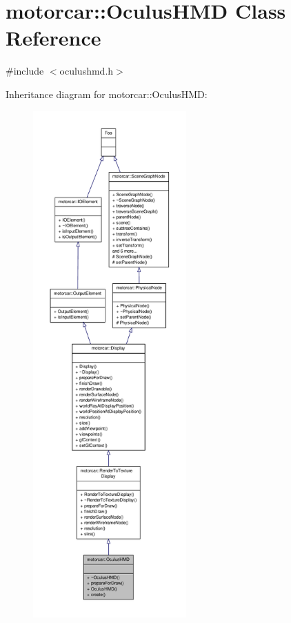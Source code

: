 \hypertarget{classmotorcar_1_1OculusHMD}{\section{motorcar\-:\-:Oculus\-H\-M\-D Class Reference}
\label{classmotorcar_1_1OculusHMD}
}


{\ttfamily \#include $<$oculushmd.\-h$>$}



Inheritance diagram for motorcar\-:\-:Oculus\-H\-M\-D\-:
\nopagebreak
\begin{figure}[H]
\begin{center}
\leavevmode
\includegraphics[height=550pt]{classmotorcar_1_1OculusHMD__inherit__graph}
\end{center}
\end{figure}


